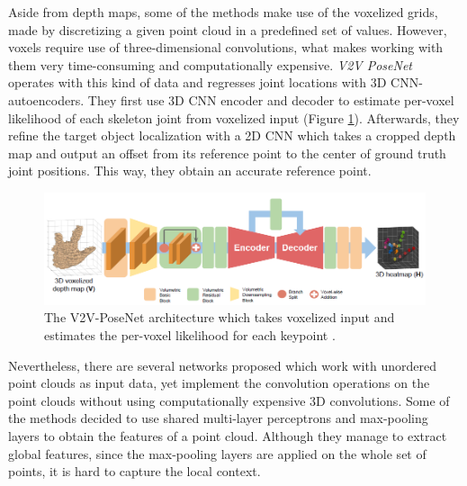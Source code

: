 \vspace{5mm}
\noindent Aside from depth maps, some of the methods make use of the voxelized grids, made by discretizing a given point cloud in a predefined set of values. However, voxels require use of three-dimensional convolutions, what makes working with them very time-consuming and computationally expensive. \textit{V2V PoseNet} \cite{DBLP:journals/corr/abs-1711-07399} operates with this kind of data and regresses joint locations with 3D CNN-autoencoders. They first use 3D CNN encoder and decoder to estimate per-voxel likelihood of each skeleton joint from voxelized input (Figure \ref{fig:v2vposenet}). Afterwards, they refine the target object localization with a 2D CNN which takes a cropped depth map and output an offset from its reference point to the center of ground truth joint positions. This way, they obtain an accurate reference point.\par

\vspace{5mm}
\begin{figure}[H]
\begin{center}
  \includegraphics[width=\textwidth]{images/related_work/v2vposenet.PNG}
  \caption[The V2V-PoseNet architecture \cite{DBLP:journals/corr/abs-1711-07399}.]{The V2V-PoseNet architecture which takes voxelized input and estimates the per-voxel likelihood for each keypoint \cite{DBLP:journals/corr/abs-1711-07399}.}
  \label{fig:v2vposenet}
\end{center}
\end{figure}



\noindent Nevertheless, there are several networks proposed which work with unordered point clouds as input data, yet implement the convolution operations on the point clouds without using computationally expensive 3D convolutions. Some of the methods decided to use shared multi-layer perceptrons and max-pooling layers to obtain the features of a point cloud. Although they manage to extract global features, since the max-pooling layers are applied on the whole set of points, it is hard to capture the local context.\par
\vspace{5mm}


